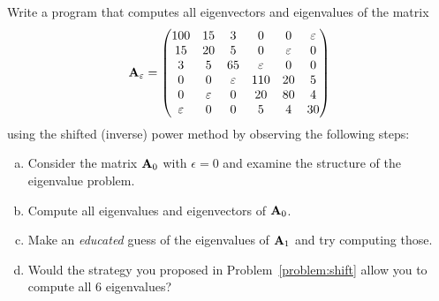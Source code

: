 \begin{Sheet}
  \begin{Problem}[Programming]
    Write a program that computes all eigenvectors and eigenvalues of
    the matrix
    \begin{gather*}
      \mathbf A_{\varepsilon} =
      \begin{pmatrix}
        100& 15& 3& 0& 0& \varepsilon \\
        15& 20& 5& 0& \varepsilon & 0 \\
        3& 5& 65& \varepsilon&  0& 0 \\
        0& 0& \varepsilon& 110& 20& 5 \\
        0& \varepsilon& 0& 20& 80& 4 \\
        \varepsilon& 0& 0& 5& 4& 30
      \end{pmatrix}
    \end{gather*}
    using the shifted (inverse) power method by observing the
    following steps:
    \begin{enumerate}[(a)]
    \item Consider the matrix $\mathbf A_0$ with $\epsilon=0$ and examine
      the structure of the eigenvalue problem.
    \item Compute all eigenvalues and eigenvectors of $\mathbf A_0$.
    \item Make an \textit{educated} guess of the eigenvalues of
      $\mathbf A_1$ and try computing those.
    \item Would the strategy you proposed in
      Problem~\ref{problem:shift} allow you to compute all 6
      eigenvalues?
    \end{enumerate}
  \end{Problem}
\end{Sheet}


